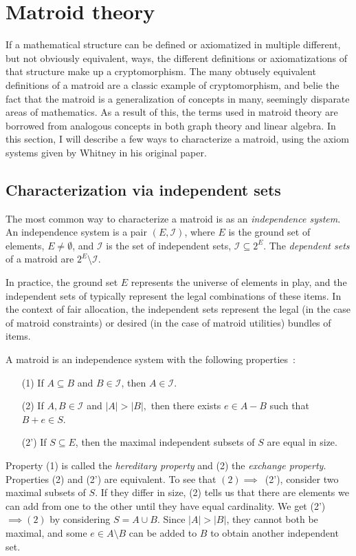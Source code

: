 \section{Matroid theory}

If a mathematical structure can be defined or axiomatized in multiple different, but not obviously equivalent, ways, the different definitions or axiomatizations of that structure make up a cryptomorphism. The many obtusely equivalent definitions of a matroid are a classic example of cryptomorphism, and belie the fact that the matroid is a generalization of concepts in many, seemingly disparate areas of mathematics. As a result of this, the terms used in matroid theory are borrowed from analogous concepts in both graph theory and linear algebra. In this section, I will describe a few ways to characterize a matroid, using the axiom systems given by Whitney in his original paper.


\subsection{Characterization via independent sets} 
\label{sec:indep_sets}
The most common way to characterize a matroid is as an \textit{independence system}. An independence system is a pair $(E, \mathcal{I})$, where $E$ is the ground set of elements, $E \not= \emptyset$, and $\mathcal{I}$ is the set of independent sets, $\mathcal{I} \subseteq 2^E$. The \textit{dependent sets} of a matroid are $2^E \setminus \mathcal{I}$. 

In practice, the ground set $E$ represents the universe of elements in play, and the independent sets of typically represent the legal combinations of these items. In the context of fair allocation, the independent sets represent the legal (in the case of matroid constraints) or desired (in the case of matroid utilities) bundles of items.

A matroid is an independence system with the following properties~\cite{whitney-1935}:
\begin{enumerate}
  \item[(1)] If $A \subseteq B$ and $B \in \mathcal{I}$, then $A \in \mathcal{I}$.
  \item[(2)] If $A, B \in \mathcal{I}$ and $|A| > |B|,$ then there exists $e \in A - B$ such that $B + e \in S$.
  \item[(2')] If $S \subseteq E$, then the maximal independent subsets of $S$ are equal in size.
\end{enumerate}
Property (1) is called the \textit{hereditary property} and (2) the \textit{exchange property}. Properties (2) and (2') are equivalent. To see that $(2) \implies$~(2'), consider two maximal subsets of $S$. If they differ in size, (2) tells us that there are elements we can add from one to the other until they have equal cardinality. We get (2')~$\implies (2)$ by considering $S = A \cup B$. Since $|A|>|B|$, they cannot both be maximal, and some $e \in A \setminus B$ can be added to $B$ to obtain another independent set.

